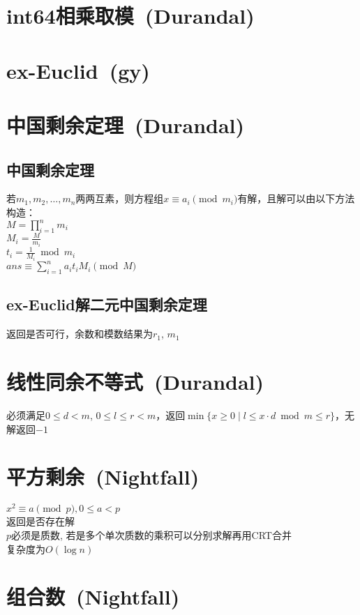 \section{int64相乘取模\ \small(Durandal)}
\section{ex-Euclid\ \small(gy)}
\section{中国剩余定理\ \small(Durandal)}
    \subsection*{中国剩余定理}
        若$ m_1, m_2, \dots, m_n $两两互素，则方程组$ x \equiv a_i \pmod{m_i} $有解，且解可以由以下方法构造：
        \\$ M = \prod\limits_{i = 1}^{n} m_i $
        \\$ M_i = \frac{M}{m_i} $
        \\$ t_i = \frac{1}{M_i} \bmod m_i $
        \\$ ans \equiv \sum\limits_{i = 1}^{n} a_i t_i M_i \pmod M $
    \subsection*{ex-Euclid解二元中国剩余定理}
        返回是否可行，余数和模数结果为$ r_1 $, $ m_1 $
\section{线性同余不等式\ \small(Durandal)}
    必须满足$ 0 \leq d < m $, $ 0 \leq l \leq r < m $，返回$ \min\lbrace x \geq 0 \mid l \leq x \cdot d \bmod m \leq r \rbrace $，无解返回$ -1 $ 
\section{平方剩余\ \small(Nightfall)}
    $ x^2 \equiv a \pmod p, 0 \leq a < p $
    \\返回是否存在解
    \\$ p $必须是质数, 若是多个单次质数的乘积可以分别求解再用CRT合并
    \\复杂度为$ O(\log n) $
\section{组合数\ \small(Nightfall)}
